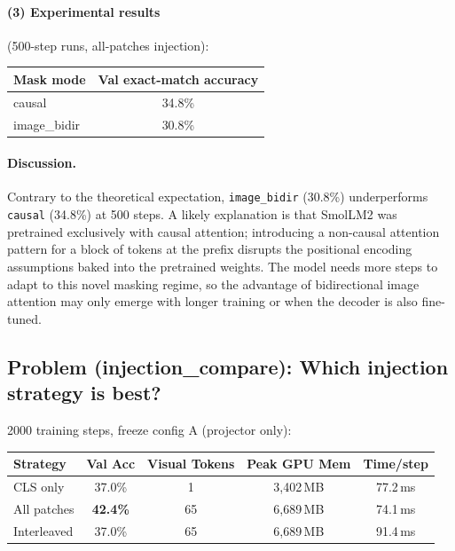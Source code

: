 \documentclass[11pt]{article}
\begin{document}
\paragraph{(3) Experimental results} (500-step runs, all-patches injection):

\begin{center}
\begin{tabular}{lc}
\toprule
Mask mode & Val exact-match accuracy \\
\midrule
causal     & 34.8\% \\
image\_bidir & 30.8\% \\
\bottomrule
\end{tabular}
\end{center}

\paragraph{Discussion.}
Contrary to the theoretical expectation, \texttt{image\_bidir} (30.8\%) underperforms \texttt{causal} (34.8\%) at 500 steps. A likely explanation is that SmolLM2 was pretrained exclusively with causal attention; introducing a non-causal attention pattern for a block of tokens at the prefix disrupts the positional encoding assumptions baked into the pretrained weights. The model needs more steps to adapt to this novel masking regime, so the advantage of bidirectional image attention may only emerge with longer training or when the decoder is also fine-tuned.

\subsection*{Problem (injection\_compare): Which injection strategy is best?}

2000 training steps, freeze config A (projector only):

\begin{center}
\begin{tabular}{lcccc}
\toprule
Strategy & Val Acc & Visual Tokens & Peak GPU Mem & Time/step \\
\midrule
CLS only    & 37.0\% & 1  & 3{,}402\,MB & 77.2\,ms \\
All patches & \textbf{42.4\%} & 65 & 6{,}689\,MB & 74.1\,ms \\
Interleaved & 37.0\% & 65 & 6{,}689\,MB & 91.4\,ms \\
\bottomrule
\end{tabular}
\end{center}
\end{document}
